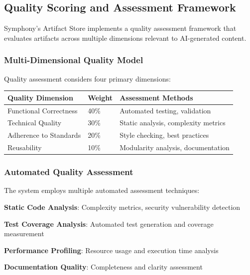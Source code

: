\subsection*{Quality Scoring and Assessment Framework}

Symphony's Artifact Store implements a quality assessment framework that evaluates artifacts across multiple dimensions relevant to AI-generated content.

\subsubsection*{Multi-Dimensional Quality Model}

Quality assessment considers four primary dimensions:

\begin{center}
\begin{tabular}{@{}lll@{}}
\toprule
\textbf{Quality Dimension} & \textbf{Weight} & \textbf{Assessment Methods} \\
\midrule
Functional Correctness & 40\% & Automated testing, validation \\
Technical Quality & 30\% & Static analysis, complexity metrics \\
Adherence to Standards & 20\% & Style checking, best practices \\
Reusability & 10\% & Modularity analysis, documentation \\
\bottomrule
\end{tabular}
\end{center}

\subsubsection*{Automated Quality Assessment}

The system employs multiple automated assessment techniques:

\begin{compactlist}
    \item \textbf{Static Code Analysis}: Complexity metrics, security vulnerability detection
    \item \textbf{Test Coverage Analysis}: Automated test generation and coverage measurement
    \item \textbf{Performance Profiling}: Resource usage and execution time analysis
    \item \textbf{Documentation Quality}: Completeness and clarity assessment
\end{compactlist}

